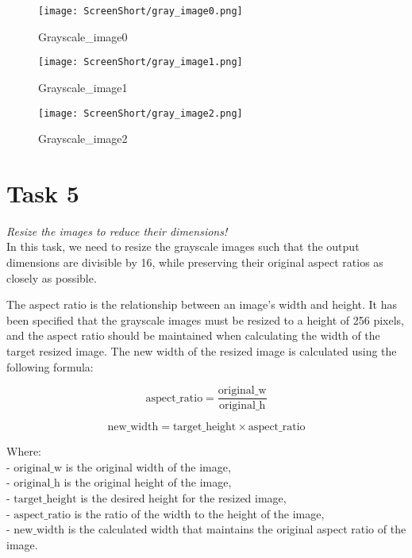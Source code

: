 \documentclass[conference,12pt]{IEEEtran}
\begin{document}
\begin{figure}[h!]
    \centering
    \texttt{[image: ScreenShort/gray\_image0.png]}
    \caption{Grayscale\_image0}
\end{figure}

\begin{figure}[h!]
    \centering
    \texttt{[image: ScreenShort/gray\_image1.png]}
    \caption{Grayscale\_image1}
\end{figure}

\begin{figure}[h!]
    \centering
    \texttt{[image: ScreenShort/gray\_image2.png]}
    \caption{Grayscale\_image2}
\end{figure}
\newpage
\section{Task 5}
\textit{Resize the images to reduce their dimensions!}\\
  In this task, we need to resize the grayscale images such that the output dimensions are divisible by 16, while preserving their original aspect ratios as closely as possible.

The aspect ratio is the relationship between an image's width and height. It has been specified that the grayscale images must be resized to a height of 256 pixels, and the aspect ratio should be maintained when calculating the width of the target resized image. The new width of the resized image is calculated using the following formula:

\begin{equation}
    \text{aspect\_ratio} = \frac{\text{original\_w}}{\text{original\_h}}
\end{equation}

\begin{equation}
    \text{new\_width} = \text{target\_height} \times \text{aspect\_ratio}
\end{equation}

Where:\\
- \(\text{original\_w}\) is the original width of the image,\\
- \(\text{original\_h}\) is the original height of the image,\\
- \(\text{target\_height}\) is the desired height for the resized image,\\
- \(\text{aspect\_ratio}\) is the ratio of the width to the height of the image,\\
- \(\text{new\_width}\) is the calculated width that maintains the original aspect ratio of the image.\\
\end{document}
